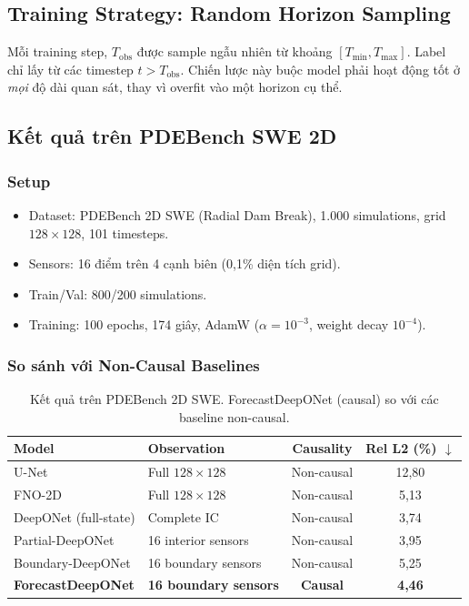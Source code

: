 \documentclass[12pt,a4paper]{article}
\begin{document}
\subsection{Training Strategy: Random Horizon Sampling}

Mỗi training step, $T_\mathrm{obs}$ được sample ngẫu nhiên từ khoảng $[T_\mathrm{min}, T_\mathrm{max}]$. Label chỉ lấy từ các timestep $t > T_\mathrm{obs}$. Chiến lược này buộc model phải hoạt động tốt ở \emph{mọi} độ dài quan sát, thay vì overfit vào một horizon cụ thể.

\subsection{Kết quả trên PDEBench SWE 2D}

\subsubsection{Setup}
\begin{itemize}[nosep]
  \item Dataset: PDEBench 2D SWE (Radial Dam Break), 1.000 simulations, grid $128 \times 128$, 101 timesteps.
  \item Sensors: 16 điểm trên 4 cạnh biên (0,1\% diện tích grid).
  \item Train/Val: 800/200 simulations.
  \item Training: 100 epochs, 174 giây, AdamW ($\alpha=10^{-3}$, weight decay $10^{-4}$).
\end{itemize}

\subsubsection{So sánh với Non-Causal Baselines}

\begin{table}[ht]
  \centering
  \caption{Kết quả trên PDEBench 2D SWE. ForecastDeepONet (causal) so với các baseline non-causal.}
  \label{tab:pdebench_results}
  \begin{tabular}{@{}llcc@{}}
    \toprule
    \textbf{Model} & \textbf{Observation} & \textbf{Causality} & \textbf{Rel L2 (\%)} $\downarrow$ \\
    \midrule
    U-Net & Full $128 \times 128$ & Non-causal & 12,80 \\
    FNO-2D & Full $128 \times 128$ & Non-causal & 5,13 \\
    DeepONet (full-state) & Complete IC & Non-causal & 3,74 \\
    Partial-DeepONet & 16 interior sensors & Non-causal & 3,95 \\
    Boundary-DeepONet & 16 boundary sensors & Non-causal & 5,25 \\
    \midrule
    \textbf{ForecastDeepONet} & \textbf{16 boundary sensors} & \textbf{Causal} & \textbf{4,46} \\
    \bottomrule
  \end{tabular}
\end{table}
\end{document}
